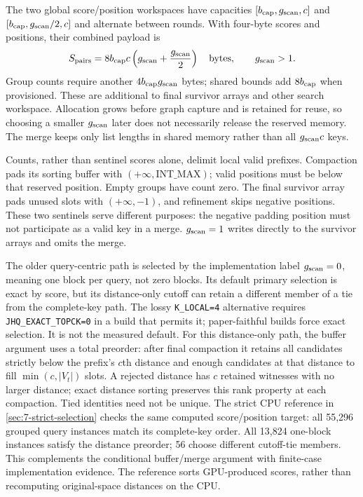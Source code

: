 The two global score/position workspaces have capacities
$[b_{\rm cap},g_{\mathrm{scan}},c]$ and $[b_{\rm cap},g_{\mathrm{scan}}/2,c]$ and alternate between
rounds. With four-byte scores and positions, their combined payload is
\begin{equation}
 S_{\rm pairs}=8b_{\rm cap}c\left(g_{\mathrm{scan}}+\frac{g_{\mathrm{scan}}}{2}\right)
 \quad\text{bytes},\qquad g_{\mathrm{scan}}>1.
 \label{eq:5-group-workspace}
\end{equation}
Group counts require another $4b_{\rm cap}g_{\mathrm{scan}}$ bytes; shared bounds add
$8b_{\rm cap}$ when provisioned. These are additional to final survivor
arrays and other search workspace. Allocation grows before graph capture
and is retained for reuse, so choosing a smaller $g_{\mathrm{scan}}$ later does not
necessarily release the reserved memory. The merge keeps only list
lengths in shared memory rather than all $g_{\mathrm{scan}} c$ keys.

Counts, rather than sentinel scores alone, delimit local valid prefixes.
Compaction pads its sorting buffer with $(+\infty,\mathrm{INT\_MAX})$;
valid positions must be below that reserved position. Empty groups have
count zero. The final survivor array pads unused slots with
$(+\infty,-1)$, and refinement skips negative positions. These two
sentinels serve different purposes: the negative padding position must
not participate as a valid key in a merge. $g_{\mathrm{scan}}=1$ writes directly to the
survivor arrays and omits the merge.

The older query-centric path is selected by the implementation label
$g_{\mathrm{scan}}=0$, meaning one block per query, not zero blocks. Its default primary
selection is exact by score, but its distance-only cutoff can retain a
different member of a tie from the complete-key path. The lossy
\texttt{K\_LOCAL=4} alternative requires
\texttt{JHQ\_EXACT\_TOPCK=0} in a build that permits it; paper-faithful
builds force exact selection. It is not the measured default.
For this distance-only path, the buffer argument uses a total preorder:
after final compaction it retains all candidates strictly below the
prefix's $c$th distance and enough candidates at that distance to fill
$\min(c,|V_t|)$ slots. A rejected distance has $c$ retained witnesses
with no larger distance; exact distance sorting preserves this rank
property at each compaction. Tied identities need not be unique.
The strict CPU reference in \cref{sec:7-strict-selection} checks the
same computed score/position target: all 55,296 grouped query instances
match its complete-key order. All 13,824 one-block instances satisfy the
distance preorder; 56 choose different cutoff-tie members. This complements
the conditional buffer/merge argument with finite-case implementation
evidence. The reference sorts GPU-produced scores, rather than recomputing
original-space distances on the CPU.
